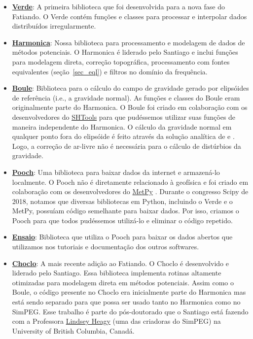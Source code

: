 \documentclass[10pt,a4paper,oneside]{book}
\begin{document}
\begin{itemize}
  \item \href{https://www.fatiando.org/verde}{\textbf{Verde}}:
    A primeira biblioteca que foi desenvolvida para a nova fase do Fatiando. O
    Verde contém funções e classes para processar e interpolar dados
    distribuídos irregularmente.
  \item \href{https://www.fatiando.org/harmonica}{\textbf{Harmonica}}:
    Nossa biblioteca para processamento e modelagem de dados de métodos
    potenciais. O Harmonica é liderado pelo Santiago e inclui funções para
    modelagem direta, correção topográfica, processamento com fontes
    equivalentes (seção~\ref{sec_eql}) e filtros no domínio da frequência.
  \item \href{https://www.fatiando.org/boule}{\textbf{Boule}}:
    Biblioteca para o cálculo do campo de gravidade gerado por elipsóides de
    referência (i.e., a gravidade normal). As funções e classes do Boule eram
    originalmente parte do Harmonica. O Boule foi criado em colaboração com os
    desenvolvedores do \href{https://github.com/SHTOOLS/SHTOOLS}{SHTools}
    \citep{Wieczorek2018} para que pudéssemos utilizar suas funções de maneira
    independente do Harmonica. O cálculo da gravidade normal em qualquer ponto
    fora do elipsóide é feito através da solução analítica de
    \citet{Lakshmanan1991} e \citet{Li2001}. Logo, a correção de ar-livre não é
    necessária para o cálculo de distúrbios da gravidade.
  \item \href{https://www.fatiando.org/pooch}{\textbf{Pooch}}:
    Uma biblioteca para baixar dados da internet e armazená-lo localmente. O
    Pooch não é diretamente relacionado à geofísica e foi criado em colaboração
    com os desenvolvedores do \href{https://github.com/Unidata/MetPy}{MetPy}
    \citep{May2016}. Durante o congresso Scipy de 2018, notamos que diversas
    bibliotecas em Python, incluindo o Verde e o MetPy, possuíam código
    semelhante para baixar dados.
    Por isso, criamos o Pooch para que todos pudéssemos utilizá-lo e eliminar
    o código repetido.
  \item \href{https://www.fatiando.org/ensaio}{\textbf{Ensaio}}:
    Biblioteca que utiliza o Pooch para baixar os dados abertos que utilizamos
    nos tutoriais e documentação dos outros softwares.
  \item \href{https://www.fatiando.org/choclo}{\textbf{Choclo}}:
    A mais recente adição ao Fatiando. O Choclo é desenvolvido e liderado pelo
    Santiago. Essa biblioteca implementa rotinas altamente otimizadas para
    modelagem direta em métodos potenciais. Assim como o Boule, o código
    presente no Choclo era inicialmente parte do Harmonica mas está sendo
    separado para que possa ser usado tanto no Harmonica como no SimPEG. Esse
    trabalho é parte do pós-doutorado que o Santiago está fazendo com a
    Professora \href{https://lindseyjh.ca/}{Lindsey Heagy} (uma das criadoras
    do SimPEG) na University of British Columbia, Canadá.
\end{itemize}
\end{document}
